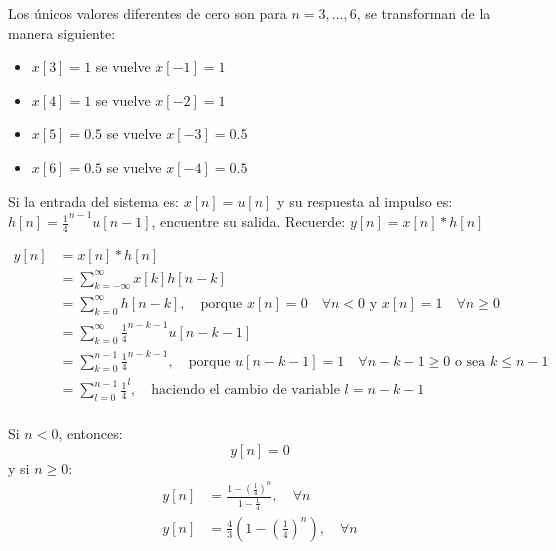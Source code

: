 \documentclass[addpoints,answers]{exam}
\begin{document}
\begin{questions}
\begin{solution}

Los únicos valores diferentes de cero son para \(n = 3, ...,6\), se transforman de la manera siguiente:

\begin{itemize}
	\item \(x[3] = 1\) se vuelve \(x[-1] = 1\)
	\item \(x[4] = 1\) se vuelve \(x[-2] = 1\)
	\item \(x[5] = 0.5\) se vuelve \(x[-3] = 0.5\)
	\item \(x[6] = 0.5\) se vuelve \(x[-4] = 0.5\)
\end{itemize}


\end{solution}

\question[5]
Si la entrada del sistema es: \(x[n] = u[n]\) y su respuesta al impulso es: \(h[n] = \frac{1}{4}^{n-1} u[n-1]\), encuentre su salida. Recuerde: \(y[n] = x[n] * h[n]\)

\begin{solution}
\[
\begin{array}{ll}
	y[n]	&= x[n] * h[n] \\
			&= \sum_{k=-\infty}^{\infty}x[k]h[n-k] \\
			&= \sum_{k=0}^{\infty}h[n-k], \quad \text{porque } x[n]=0 \quad \forall n<0 \text{ y } x[n]=1 \quad \forall n \geq 0 \\
			&= \sum_{k=0}^{\infty}\frac{1}{4}^{n-k-1} u[n-k-1] \\
			&= \sum_{k=0}^{n-1}\frac{1}{4}^{n-k-1}, \quad \text{porque } u[n-k-1]=1 \quad \forall n-k-1 \geq 0 \text{ o sea  } k \leq n-1 \\
			&= \sum_{l=0}^{n-1}\frac{1}{4}^{l}, \quad \text{haciendo el cambio de variable } l=n-k-1 \\
\end{array}
\]

Si \(n<0\), entonces:
\[
y[n] = 0
\]
y si \(n\geq 0\):
\[
\begin{array}{ll}
	y[n] 	&= \frac{1-\left(\frac{1}{4}\right)^n}{1-\frac{1}{4}}, \quad \forall n \\
	y[n]	&= \frac{4}{3}\left(1-\left(\frac{1}{4}\right)^n\right), \quad \forall n
\end{array}
\]


\end{solution}
\end{questions}
\end{document}
